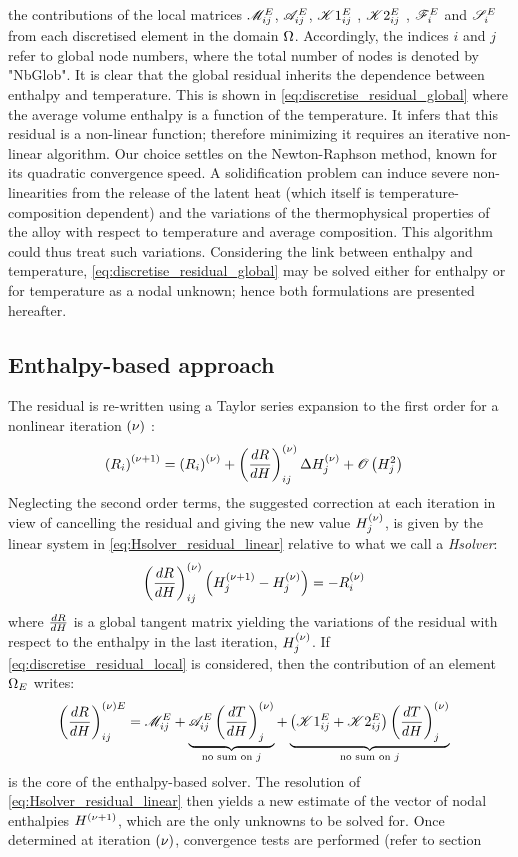 the contributions of the local matrices $\mathscr{M}_{ij}^E$, $\mathscr{A}_{ij}^E$, $\mathscr{K}1_{ij}^E$ , $\mathscr{K}2_{ij}^E$ , $\mathscr{F}_{i}^E$ and $\mathscr{S}_{i}^E$ from each discretised 
element in the domain $\Omega$. Accordingly, the indices $i$ and $j$ refer to global node numbers, where the total number of nodes is 
denoted by "NbGlob". It is clear that the global residual inherits the dependence between enthalpy and temperature. 
This is shown in \cref{eq:discretise_residual_global} where the average volume enthalpy is a function of the temperature. It infers that this residual 
is a non-linear function; therefore minimizing it requires an iterative non-linear algorithm. Our choice settles on the 
Newton-Raphson method, known for its quadratic convergence speed. A solidification problem can induce severe non-linearities 
from the release of the latent heat (which itself is temperature-composition dependent) and the variations of the thermophysical 
properties of the alloy with respect to temperature and average composition. This algorithm could thus treat such variations. 
Considering the link between enthalpy and temperature, \cref{eq:discretise_residual_global} may be solved either for enthalpy 
or for temperature as a nodal unknown; hence both formulations are presented hereafter.
%
%
\subsection{Enthalpy-based approach }
The residual is re-written using a Taylor series expansion to the first order for a nonlinear iteration ${\left( \nu \right)}$ :
\begin{align}
\label{eq:Hsolver_residual}
& \left( R_i \right)^{{\left( \nu+1 \right)}} = \left( R_i \right)^{{\left( \nu \right)}} + \left( \frac{dR}{dH} \right)^{{\left( \nu \right)}}_{ij} \Delta H_j^{{\left( \nu \right)}} + \mathscr{O}\left( H_j^2 \right)
\end{align}
Neglecting the second order terms, the suggested correction at each iteration in view of cancelling 
the residual and giving the new value $H_j^{{\left( \nu \right)}}$, is given by the linear system in \cref{eq:Hsolver_residual_linear}
relative to what we call a \emph{Hsolver}:
\begin{align}
\label{eq:Hsolver_residual_linear}
& \left( \frac{dR}{dH} \right)^{{\left( \nu \right)}}_{ij} \left( H_j^{{\left( \nu+1 \right)}} - H_j^{{\left( \nu \right)}} \right) = -R_i^{{\left( \nu \right)}}
\end{align}
where $\frac{dR}{dH}$ is a global tangent matrix yielding the variations of the residual with respect to the enthalpy 
in the last iteration, $H_j^{{\left( \nu \right)}}$. If \cref{eq:discretise_residual_local} is considered, then the contribution of an element $\Omega_E$ writes:
\begin{align}
\label{eq:dRdH}
& \left( \frac{dR}{dH} \right)^{{\left( \nu \right)} E}_{ij} 
= \mathscr{M}_{ij}^E 
+ \underbrace{\mathscr{A}_{ij}^E \left( \frac{dT}{dH} \right)^{{\left( \nu \right)}}_{j}}_{\text{no sum on }j}
+ \underbrace{\left( \mathscr{K}1_{ij}^E + \mathscr{K}2_{ij}^E \right) \left( \frac{dT}{dH} \right)^{{\left( \nu \right)}}_{j}}_{\text{no sum on }j}
\end{align}
 is the core of the enthalpy-based solver. The resolution of \cref{eq:Hsolver_residual_linear} 
then yields a new estimate of the vector of nodal enthalpies $H^{{\left( \nu+1 \right)}}$, which are the only unknowns to be solved for. 
Once determined at iteration ${\left( \nu \right)}$, convergence tests are performed (refer to section %
%
%
